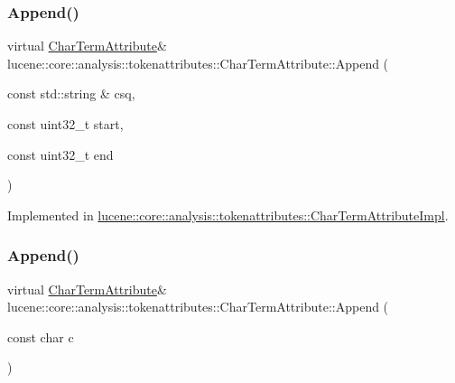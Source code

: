 \mbox{\label{classlucene_1_1core_1_1analysis_1_1tokenattributes_1_1CharTermAttribute_a1fc0d3eaff550a10e8fc17a5e7bb98bc}} 
\subsubsection{\texorpdfstring{Append()}{Append()}\hspace{0.1cm}{\footnotesize\ttfamily [2/4]}}
{\footnotesize\ttfamily virtual \mbox{\hyperlink{classlucene_1_1core_1_1analysis_1_1tokenattributes_1_1CharTermAttribute}{Char\+Term\+Attribute}}\& lucene\+::core\+::analysis\+::tokenattributes\+::\+Char\+Term\+Attribute\+::\+Append (\begin{DoxyParamCaption}\item[{const std\+::string \&}]{csq,  }\item[{const uint32\+\_\+t}]{start,  }\item[{const uint32\+\_\+t}]{end }\end{DoxyParamCaption})\hspace{0.3cm}{\ttfamily [pure virtual]}}



Implemented in \mbox{\hyperlink{classlucene_1_1core_1_1analysis_1_1tokenattributes_1_1CharTermAttributeImpl_a5d2f89510d37dc11bbf22a77ac6bff83}{lucene\+::core\+::analysis\+::tokenattributes\+::\+Char\+Term\+Attribute\+Impl}}.

\mbox{\label{classlucene_1_1core_1_1analysis_1_1tokenattributes_1_1CharTermAttribute_a069f61e1cb30895a205e615c1d154148}} 
\subsubsection{\texorpdfstring{Append()}{Append()}\hspace{0.1cm}{\footnotesize\ttfamily [3/4]}}
{\footnotesize\ttfamily virtual \mbox{\hyperlink{classlucene_1_1core_1_1analysis_1_1tokenattributes_1_1CharTermAttribute}{Char\+Term\+Attribute}}\& lucene\+::core\+::analysis\+::tokenattributes\+::\+Char\+Term\+Attribute\+::\+Append (\begin{DoxyParamCaption}\item[{const char}]{c }\end{DoxyParamCaption})\hspace{0.3cm}{\ttfamily [pure virtual]}}



